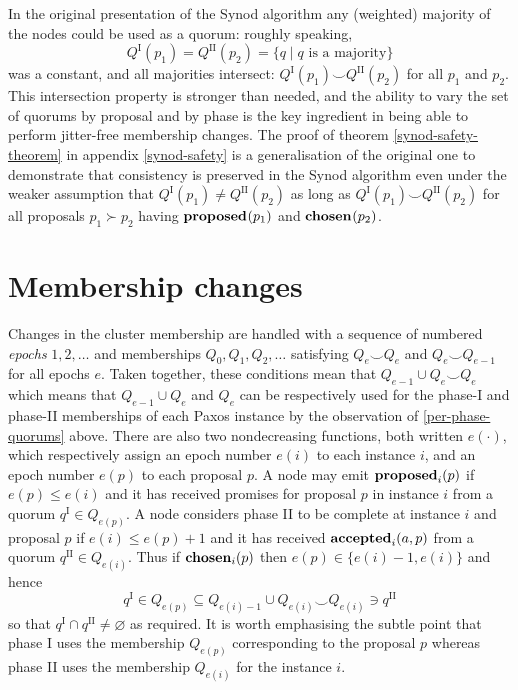 \documentclass[journal]{IEEEtran}
\begin{document}
In the original presentation of the Synod algorithm any (weighted) majority of
the nodes could be used as a quorum: roughly speaking, \[Q^\textrm{I}(p_1) =
Q^\textrm{II}(p_2) = \{ q \mid q \text{ is a majority}\}\] was a constant, and
all majorities intersect: $Q^\textrm{I}(p_1) \smile Q^\textrm{II}(p_2)$ for all
$p_1$ and $p_2$. This intersection property is stronger than needed, and the
ability to vary the set of quorums by proposal and by phase is the key
ingredient in being able to perform jitter-free membership changes. The proof
of theorem \ref{synod-safety-theorem} in appendix \ref{synod-safety} is a
generalisation of the original one to demonstrate that consistency is preserved
in the Synod algorithm even under the weaker assumption that $Q^\textrm{I}(p_1)
\ne Q^\textrm{II}(p_2)$ as long as $Q^\textrm{I}(p_1) \smile
Q^\textrm{II}(p_2)$ for all proposals $p_1 \succ p_2$ having $\mathbf{proposed}_{}(p_1)$ and
$\mathbf{chosen}_{}(p_2)$.

\section{Membership changes}\label{membership-changes}

Changes in the cluster membership are handled with a sequence of numbered
\textit{epochs} $1, 2, \ldots$ and memberships $Q_0, Q_1, Q_2, \ldots$
satisfying $Q_e \smile Q_e$ and $Q_e \smile Q_{e-1}$ for all epochs $e$.  Taken
together, these conditions mean that $Q_{e-1} \cup Q_e \smile Q_e$ which means
that $Q_{e-1} \cup Q_e$ and $Q_e$ can be respectively used for the phase-I and
phase-II memberships of each Paxos instance by the observation of
\ref{per-phase-quorums} above.  There are also two nondecreasing functions,
both written $e(\cdot)$, which respectively assign an epoch number $e(i)$ to
each instance $i$, and an epoch number $e(p)$ to each proposal $p$. A node may
emit $\mathbf{proposed}_{i}(p)$ if $e(p) \le e(i)$ and it has received promises for proposal
$p$ in instance $i$ from a quorum $q^\textrm{I} \in Q_{e(p)}$. A node considers
phase II to be complete at instance $i$ and proposal $p$ if ${e(i) \le e(p)+1}$
and it has received $\mathbf{accepted}_{i}(a,p)$ from a quorum ${q^\textrm{II} \in
Q_{e(i)}}$.  Thus if $\mathbf{chosen}_{i}(p)$ then ${e(p) \in \{ e(i)-1, e(i) \}}$ and
hence \[q^\textrm{I} \in Q_{e(p)} \subseteq Q_{e(i)-1} \cup Q_{e(i)} \smile
Q_{e(i)} \ni q^\textrm{II}\] so that $q^\textrm{I} \cap q^\textrm{II} \ne
\varnothing$ as required. It is worth emphasising the subtle point that phase I
uses the membership $Q_{e(p)}$ corresponding to the proposal $p$ whereas phase
II uses the membership $Q_{e(i)}$ for the instance $i$.
\end{document}
